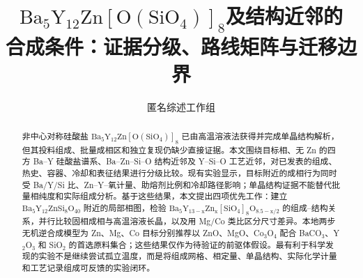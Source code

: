 \documentclass[11pt]{article}
\title{$\mathrm{Ba_5Y_{12}Zn[O(SiO_4)]_8}$及结构近邻的\\
合成条件：证据分级、路线矩阵与迁移边界}
\author{匿名综述工作组}
\date{}
\begin{document}
\maketitle

\begin{abstract}
非中心对称硅酸盐 $\mathrm{Ba_5Y_{12}Zn[O(SiO_4)]_8}$ 已由高温溶液法获得并完成单晶结构解析，但其投料组成、批量成相区和独立复现仍缺少直接证据。本文围绕目标相、无 Zn 的四方 Ba--Y 硅酸盐谱系、Ba--Zn--Si--O 结构近邻及 Y--Si--O 工艺近邻，对已发表的组成、热史、容器、冷却和表征结果进行分级比较。现有实验显示，目标附近的成相行为同时受 Ba/Y/Si 比、Zn--Y--氧计量、助熔剂比例和冷却路径影响；单晶结构证据不能替代批量相纯度和实际组成分析。基于这些结果，本文提出四项优先工作：建立 $\mathrm{Ba_5Y_{12}ZnSi_8O_{40}}$ 附近的局部相图，检验 $\mathrm{Ba_5Y_{13-x}Zn_x[SiO_4]_8O_{8.5-x/2}}$ 的组成--结构关系，并行比较固相成相与高温溶液长晶，以及用 Mg/Co 类比区分尺寸差异。本地两步无机逆合成模型为 Zn、Mg、Co 目标分别推荐以 ZnO、MgO、Co$_3$O$_4$ 配合 BaCO$_3$、Y$_2$O$_3$ 和 SiO$_2$ 的首选原料集合；这些结果仅作为待验证的前驱体假设。最有利于科学发现的实验不是继续尝试孤立温度，而是将组成网格、相定量、单晶结构、实际化学计量和工艺记录组成可反馈的实验闭环。
\end{abstract}













\clearpage


\end{document}
